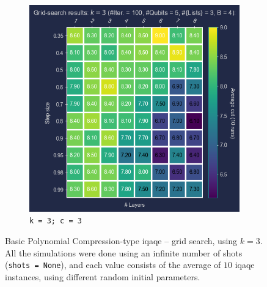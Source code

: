 \begin{figure}[ht!]
\begin{subfigure}[b]{0.475\textwidth}
      \includegraphics[width=1\textwidth]{Figures/Chapter_5/k=3(Grid_search)/iQAQE_k3_Grid_Search_step_size_n_layers_c=3.png}
      \caption{\texttt{k = 3; c = 3}}
      \label{fig:k=3;c=3}
  \end{subfigure}
  \caption{Basic Polynomial Compression-type \acrshort{iqaqe} – grid search, using $k=3$. All the simulations were done using an infinite number of shots (\texttt{shots = None}), and each value consists of the average of $10$ \acrshort{iqaqe} instances, using different random initial parameters.}
  \label{fig:k=3}
\end{figure}

